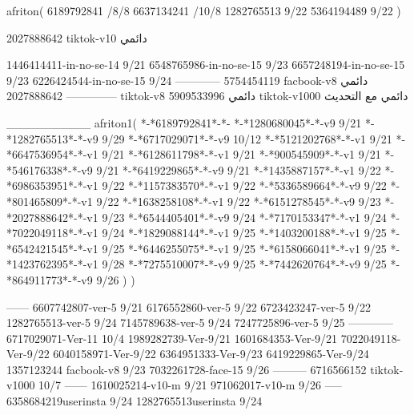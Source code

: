 afriton(
6189792841 /8/8
6637134241 /10/8
1282765513 9/22
5364194489 9/22
)

2027888642 tiktok-v10
دائمي



1446414411-in-no-se-14 9/21
6548765986-in-no-se-15 9/23
6657248194-in-no-se-15 9/23
6226424544-in-no-se-15 9/24
------------
5754454119 facbook-v8
دائمي
--------------
2027888642 tiktok-v8
دائمي
5909533996 tiktok-v1000
دائمي مع التحديث

__________
afriton1(
*-*6189792841*-*-
*-*1280680045*-*-v9 9/21
*-*1282765513*-*-v9 9/29
*-*6717029071*-*-v9 10/12
*-*5121202768*-*-v1 9/21
*-*6647536954*-*-v1 9/21
*-*6128611798*-*-v1 9/21
*-*900545909*-*-v1 9/21
*-*546176338*-*-v9 9/21
*-*6419229865*-*-v9 9/21
*-*1435887157*-*-v1 9/22
*-*6986353951*-*-v1 9/22
*-*1157383570*-*-v1 9/22
*-*5336589664*-*-v9 9/22
*-*801465809*-*-v1 9/22
*-*1638258108*-*-v1 9/22
*-*6151278545*-*-v9 9/23
*-*2027888642*-*-v1 9/23
*-*6544405401*-*-v9 9/24
*-*7170153347*-*-v1 9/24
*-*7022049118*-*-v1 9/24
*-*1829088144*-*-v1 9/25
*-*1403200188*-*-v1 9/25
*-*6542421545*-*-v1 9/25
*-*6446255075*-*-v1 9/25
*-*6158066041*-*-v1 9/25
*-*1423762395*-*-v1 9/28
*-*7275510007*-*-v9 9/25
*-*7442620764*-*-v9 9/25
*-*864911773*-*-v9 9/26
)
)

------
6607742807-ver-5 9/21
6176552860-ver-5 9/22
6723423247-ver-5 9/22
1282765513-ver-5 9/24
7145789638-ver-5 9/24
7247725896-ver-5 9/25
------------
6717029071-Ver-11
10/4
1989282739-Ver-9/21
1601684353-Ver-9/21
7022049118-Ver-9/22
6040158971-Ver-9/22
6364951333-Ver-9/23
6419229865-Ver-9/24
1357123244 facbook-v8 9/23
7032261728-face-15 9/26
---------
6716566152 tiktok-v1000
10/7
------
1610025214-v10-m 9/21
971062017-v10-m 9/26
-----
6358684219userinsta 9/24
1282765513userinsta 9/24
